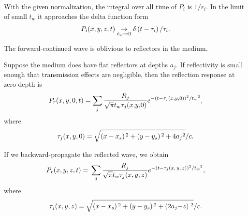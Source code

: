 With the given normalization, the integral over all time of \(P_i\) is \(1/r_i\). In the limit of small \(t_w\) it approaches the
delta function form
\begin{equation}\text{\textit{$P_i(x,y,z,t)$}}\text{\textit{$ $}}\underset{\text{\textit{$t_w$}}\to 0}{\to } \delta \left(\text{\textit{$t$}}-\tau
_i\right)/\text{\textit{$\tau _i$}}.\end{equation}

The forward-continued wave is oblivious to reflectors in the medium.

Suppose the medium does have flat reflectors at depths \(a_j\). If reflectivity is small enough that transmission effects are negligible, then
the reflection response at zero depth is
\begin{equation}\text{\textit{$P_r$}}\text{\textit{$($}}\text{\textit{$x$}}\text{\textit{$,$}}\,\text{\textit{$y$}}\text{\textit{$,$}}\,0\text{\textit{$,$}}\,\text{\textit{$t$}}\text{\textit{$)$}}\text{\textit{$
$}}=\sum _{\text{\textit{$j$}}} \text{\textit{$ $}}\frac{\text{\textit{$R$}}_{\text{\textit{$j$}}}}{\sqrt{\pi }\text{\textit{$t_w$}}\tau _{\text{\textit{$j$}}}\text{\textit{$($}}\text{\textit{$x$}}\text{\textit{$,$}}\text{\textit{$y$}}\text{\textit{$,$}}0\text{\textit{$)$}}}e^{-\left(\text{\textit{$t$}}-\tau
_{\text{\textit{$j$}}}\text{\textit{$($}}\text{\textit{$x$}}\text{\textit{$,$}}\text{\textit{$y$}}\text{\textit{$,$}}0\text{\textit{$)$}}\right){}^2/\text{\textit{$t_w$}}{}^2},\end{equation}
where
\begin{equation}\tau _{\text{\textit{$j$}}}\text{\textit{$($}}\text{\textit{$x$}}\text{\textit{$,$}}\,\text{\textit{$y$}}\text{\textit{$,$}}\,0\text{\textit{$)$}}=\sqrt{\left(\text{\textit{$x$}}-\text{\textit{$x_s$}}\right){}^2+\left(\text{\textit{$y$}}-\text{\textit{$y_s$}}\right){}^2+4\text{\textit{$a$}}_{\text{\textit{$j$}}}{}^2}/\text{\textit{$c.$}}\end{equation}

If we backward-propagate the reflected wave, we obtain
\begin{equation}\text{\textit{$P_r(x,y,z,t)$}}\text{\textit{$ $}}=\text{\textit{$ $}}\sum _{\text{\textit{$j$}}} \text{\textit{$ $}}\frac{\text{\textit{$R$}}_{\text{\textit{$j$}}}}{\sqrt{\pi
}\text{\textit{$t_w$}}\tau _{\text{\textit{$j$}}}\text{\textit{$(x,y,z)$}}}e^{-\left(\text{\textit{$t$}}-\tau _{\text{\textit{$j$}}}\text{\textit{$(x,y,z)$}}\right){}^2/\text{\textit{$t_w$}}{}^2},\end{equation}
where
\begin{equation}\tau _{\text{\textit{$j$}}}\text{\textit{$(x,y,z)$}}=\sqrt{\left(\text{\textit{$x$}}-\text{\textit{$x_s$}}\right){}^2+\left(\text{\textit{$y$}}-\text{\textit{$y_s$}}\right){}^2+\left(2\text{\textit{$a$}}_{\text{\textit{$j$}}}\text{\textit{$-$}}\text{\textit{$z$}}\text{\textit{$)$}}\right.{}^2}/\text{\textit{$c.$}}\end{equation}


